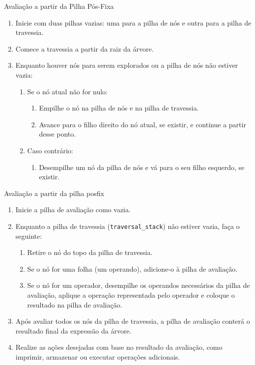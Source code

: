 \documentclass{article}
\begin{document}
\begin{adjustwidth}{1em}{1em}
\begin{algorithm}
\caption{Avaliação a partir da Pilha Pós-Fixa}
\begin{enumerate}
    \item Inicie com duas pilhas vazias: uma para a pilha de nós e outra para a pilha de travessia.
    \item Comece a travessia a partir da raiz da árvore.
    \item Enquanto houver nós para serem explorados ou a pilha de nós não estiver vazia:
    \begin{enumerate}
        \item Se o nó atual não for nulo:
        \begin{enumerate}
            \item Empilhe o nó na pilha de nós e na pilha de travessia.
            \item Avance para o filho direito do nó atual, se existir, e continue a partir desse ponto.
        \end{enumerate}
        \item Caso contrário:
        \begin{enumerate}
            \item Desempilhe um nó da pilha de nós e vá para o seu filho esquerdo, se existir.
        \end{enumerate}
    \end{enumerate}
\end{enumerate}
\end{algorithm}




\begin{algorithm}
\caption{Avaliação a partir da pilha posfix}
\begin{enumerate}
    \item Inicie a pilha de avaliação como vazia.
    \item Enquanto a pilha de travessia (\texttt{traversal\_stack}) não estiver vazia, faça o seguinte:
    \begin{enumerate}
        \item Retire o nó do topo da pilha de travessia.
        \item Se o nó for uma folha (um operando), adicione-o à pilha de avaliação.
        \item Se o nó for um operador, desempilhe os operandos necessários da pilha de avaliação, aplique a operação representada pelo operador e coloque o resultado na pilha de avaliação.
    \end{enumerate}
    \item Após avaliar todos os nós da pilha de travessia, a pilha de avaliação conterá o resultado final da expressão da árvore.
    \item Realize as ações desejadas com base no resultado da avaliação, como imprimir, armazenar ou executar operações adicionais.
\end{enumerate}
\end{algorithm}

\end{adjustwidth}
\end{document}
